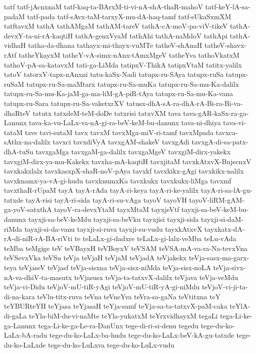 {tatf
tatf-jAcnxnaM
tatf-kaq-ta-BArxM-ti-vi-nA-shA-thaR-mahoV
tatf-keY-lA-sa-padaM
tatf-pada
tatf-sAvx-taM-tarxyX-mu-dA-haq-tamf
tatf-sUkaSxmXM
tatftavxM
tathA
tathAMgaM
tathAM-tareV
tathA-cA-moV-pa-viV-tikeV
tathA-devxY-ta-ni-rA-kaqtiH
tathA-genxVyaM
tathAhi
tathA-naMdoV
tathApi
tathA-vidhaH
tatha-da-dhana
tathayx-mi-thayx-vuMTe
tatheV-shAnaH
tatheV-shavx-rAtf
tatheYkayxM
tatheY-vA-simx-nAnx-tAmxMgeV
tatheYva
tathoVkatxM
tathoV-pA-sa-katavxM
tati-ga-LiMda
tatipxV-ThikA
tatipxVtaM
tatitx-yalilx
tatoV
tatorxV-tapx-nAnxni
tatu-kaSx-Nadi
tatupx-ru-SAya
tatupx-ruSa
tatupx-ruSaM
tatupx-ru-Sa-maMtarx
tatupx-ru-Sa-muKa
tatupx-ru-Sa-mu-Ka-dalilx
tatupx-ru-Sa-mu-Ka-jaM-ga-ma-liM-gA-piR-tAya
tatupx-ru-Sa-mu-Ka-vana
tatupx-ru-Sara
tatupx-ru-Sa-vaketxrXV
tatusx-dhA-sA-ra-dhA-rA-Bi-ra-Bi-va-dhaRteV
tatutx
tatxdeM-teM-doDe
tatxrisi
tatxvXM
tava
tava-gAR-kaSx-ra-ga-Lanunx
tava-ka-vu-LaLx-va-nA-gi-ra-beV-keM-bu-danunx
tava-ni-dhiya
tava-vi-tataM
tave
tavi-sutaM
tavx
tavxM
tavxMga-miV-ri-tamf
tavxMpada
tavxca-sAthx-na-dalilx
tavxci
tavxdiVyA
tavxgAM-shakeV
tavxgAdi
tavxgA-di-sa-patx-dhA-tuSu
tavxgaMga
tavxgaM-ga-dalilx
tavxgaMgeV
tavxgiM-dirx-yakekx
tavxgiM-dirx-ya-mu-Kakekx
tavxha-mA-kaqtiH
tavxjitaM
tavxkAtxvX-BujecnxV
tavxkakxlalx
tavxkasxpX-shaR-noV-pAya
tavxkf
tavxkikx-gAgi
tavxkikx-nalilx
tavxknamx-ya-vA-gi-hudu
tavxknumxKa
tavxkukx
tavxkukx-liMga
tavxmf
tavxthaR-rUpaM
tayA
tayA-rAda
tayA-ri-keya
tayA-ri-ke-yalilx
tayA-ri-sa-lA-gu-tatxde
tayA-risi
tayA-ri-sida
tayA-ri-su-vAga
tayoV
tayoVH
tayoV-liRM-gAM-ga-yoV-satxthA
tayoV-ra-devxYtaM
tayxMtaM
tayxjeVtf
tayxji-sa-beV-keM-bu-danunx
tayxji-sa-beV-keMdu
tayxji-sa-beVku
tayxjisi
tayxji-sida
tayxji-si-daM-riMda
tayxji-si-da-vanu
tayxji-si-ruva
tayxji-su-vudu
tayxkAtxvX
tayxkatx-dA-rA-di-niR-rA-BA-riVti
te
teLaLx-gi-dadxre
teLaLx-gi-lalx-veMba
teLu-vAda
teMba
teMgige
teV
teVBayxH
teVBoyxV
teVSAM
teVSA-mA-va-ra-Na-tevxVna
teVSevxVka
teVSu
teVja
teVjaH
teVjaM
teVjadA
teVjakekx
teVja-sasx-ma-garx-teya
teVjaseV
teVjasf
teVja-sisxna
teVja-sisx-niMda
teVja-sisx-noLA
teVja-sivx-nA-va-dhiV-ta-masutx
teVjasusx
teVja-ta-tatxvX-dalilx
teVjava
teVja-veMdu
teVja-vi-Didu
teVjoV-mU-tiR-yAgi
teVjoV-mU-tiR-yA-gi-niMdu
teVjoV-vi-ji-ta-di-na-kara
teVlu-titx-ruva
teVna
teVneYva
teVra-sa-gaNa
teVtitxna
teY
teYBURteYH
teYjasa
teYjasaH
teYja-samf
teYja-sa-ta-tatxvX-paM-caka
teYlA-di-gaLa
teYla-biM-du-vi-naMte
teYla-yukatxM
teYrxvidhayxM
tegaLi
tega-Li-ke-ga-Lanunx
tega-Li-ke-ga-Le-ra-DanUnx
tege-di-ri-si-denu
tegedu
tege-du-ko-LaLx-bA-radu
tege-du-ko-LaLx-ba-hudu
tege-du-ko-LaLx-beV-kA-gu-tatxde
tege-du-ko-LaLxde
tege-du-ko-LuLxva
tege-du-ko-LuLx-vudu
}
